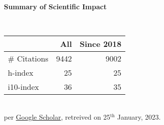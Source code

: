 \headedsection %
{\bf Summary of Scientific Impact}{}{}
{
    \qquad~~~~
    \begin{minipage}[t]{0.6\textwidth}
        \begin{tabular}{lrr}
        \hline
         & All & Since 2018\\
        \hline
        \# Citations    & 9442  & 9002  \\
        h-index         & 25    & 25    \\
        i10-index       & 36    & 35    \\
        \hline
    \end{tabular}
    \\
    {\footnotesize{
        per \href{https://scholar.google.com/citations?user=wpLQuroAAAAJ}{Google Scholar}, retreived on 25$^\text{th}$ January, 2023.
        }
    }
    \end{minipage}
     
}